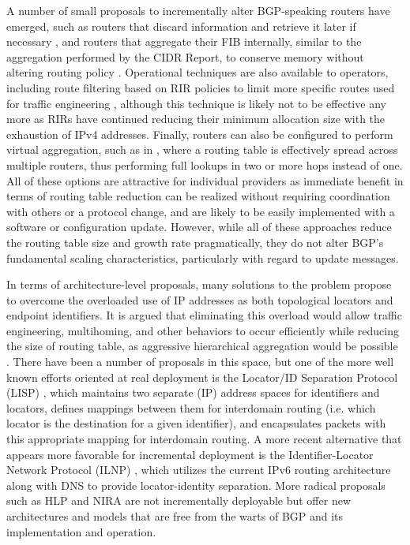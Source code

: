 A number of small proposals to incrementally alter BGP-speaking routers have
emerged, such as routers that discard information and retrieve it later if
necessary \cite{Karpilovsky:2006ys}, and routers that aggregate their FIB
internally, similar to the aggregation performed by the CIDR Report, to
conserve memory without altering routing policy \cite{Zhao:2010vn}. Operational
techniques are also available to operators, including route filtering based on
RIR policies to limit more specific routes used for traffic engineering
\cite{Bellovin:2001qf}, although this technique is likely not to be effective
any more as RIRs have continued reducing their minimum allocation size with the
exhaustion of IPv4 addresses. Finally, routers can also be configured to
perform virtual aggregation, such as in \cite{Ballani:2009tg}, where a routing
table is effectively spread across multiple routers, thus performing full
lookups in two or more hops instead of one. All of these options are attractive
for individual providers as immediate benefit in terms of routing table
reduction can be realized without requiring coordination with others or a
protocol change, and are likely to be easily implemented with a software or
configuration update. However, while all of these approaches reduce the
routing table size and growth rate pragmatically, they do not alter BGP's
fundamental scaling characteristics, particularly with regard to update
messages.

In terms of architecture-level proposals, many solutions to the problem propose
to overcome the overloaded use of IP addresses as both topological locators and
endpoint identifiers. It is argued that eliminating this overload would allow
traffic engineering, multihoming, and other behaviors to occur efficiently
while reducing the size of routing table, as aggressive hierarchical
aggregation would be possible \cite{Quoitin:2007uq}. There have been a
number of proposals in this space, but one of the more well known efforts
oriented at real deployment is the Locator/ID Separation Protocol (LISP)
\cite{lisp-id}, which maintains two separate (IP) address spaces for
identifiers and locators, defines mappings between them for interdomain routing
(i.e. which locator is the destination for a given identifier), and
encapsulates packets with this appropriate mapping for interdomain routing. A
more recent alternative that appears more favorable for incremental deployment
is the Identifier-Locator Network Protocol (ILNP) \cite{Atkinson:2010zr},
which utilizes the current IPv6 routing architecture along with DNS to provide
locator-identity separation.  More radical proposals such as HLP
\cite{Subramanian:2005ve} and NIRA \cite{Yang:2007cr} are not incrementally
deployable but offer new architectures and models that are free from the warts
of BGP and its implementation and operation.

